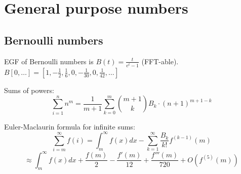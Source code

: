 \section{General purpose numbers}
	\subsection{Bernoulli numbers}
		EGF of Bernoulli numbers is $B(t)=\frac{t}{e^t-1}$ (FFT-able).
		$B[0,\ldots] = [1, -\frac{1}{2}, \frac{1}{6}, 0, -\frac{1}{30}, 0, \frac{1}{42}, \ldots]$

		Sums of powers:
		\small
		\[ \sum_{i=1}^n n^m = \frac{1}{m+1} \sum_{k=0}^m \binom{m+1}{k} B_k \cdot (n+1)^{m+1-k} \]
		\normalsize

		Euler-Maclaurin formula for infinite sums:
		\small
		\[ \sum_{i=m}^{\infty} f(i) = \int_m^\infty f(x) dx - \sum_{k=1}^\infty \frac{B_k}{k!}f^{(k-1)}(m) \]
		\[ \approx \int_{m}^\infty f(x)dx + \frac{f(m)}{2} - \frac{f'(m)}{12} + \frac{f'''(m)}{720} + O(f^{(5)}(m)) \]
		\normalsize




